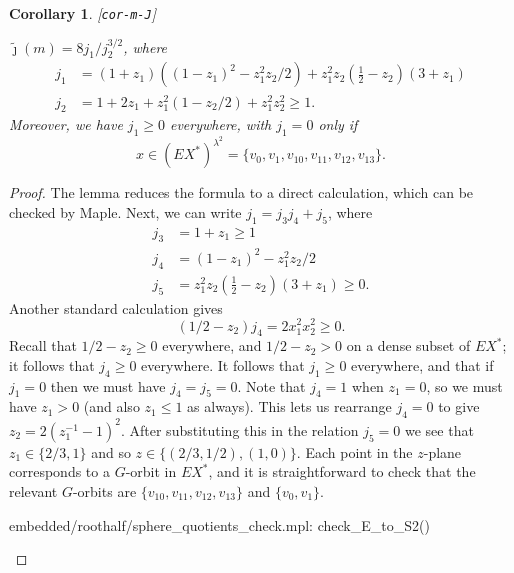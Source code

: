 \documentclass[reqno]{amsart}
\newcommand{\lbl}[1]{\label{#1}\textup{[\texttt{#1}]}\par}
\newcommand{\lbl}{\label}
\newcommand{\lm}        {\lambda}
\newcommand{\half}      {\tfrac{1}{2}}
\newcommand{\tj}	{\widetilde{\jmath}}
\renewcommand{\:}{\colon}
\newtheorem{corollary}[theorem]{Corollary}
\theoremstyle{definition}
\begin{document}
\begin{corollary}\lbl{cor-m-J}
 $\tj(m)=8j_1/j_2^{3/2}$, where
 \begin{align*}
  j_1 &= (1+z_1)((1-z_1)^2-z_1^2z_2/2) + z_1^2z_2(\half-z_2)(3+z_1) \\
  j_2 &= 1+2z_1+z_1^2(1-z_2/2)+z_1^2z_2^2 \geq 1.
 \end{align*}
 Moreover, we have $j_1\geq 0$ everywhere, with $j_1=0$ only if
 \[ x \in (EX^*)^{\lm^2} = \{v_0,v_1,v_{10},v_{11},v_{12},v_{13}\}. \]
\end{corollary}
\begin{proof}
 The lemma reduces the formula to a direct calculation, which can be
 checked by Maple.  Next, we can write $j_1=j_3j_4+j_5$, where
 \begin{align*}
  j_3 &= 1 + z_1 \geq 1 \\
  j_4 &= (1-z_1)^2-z_1^2z_2/2 \\
  j_5 &= z_1^2z_2(\half-z_2)(3+z_1) \geq 0.
 \end{align*}
 Another standard calculation gives
 \[ (1/2-z_2)j_4 = 2x_1^2x_2^2 \geq 0. \]
 Recall that $1/2-z_2\geq 0$ everywhere, and $1/2-z_2>0$ on a dense
 subset of $EX^*$; it follows that $j_4\geq 0$ everywhere.  It follows
 that $j_1\geq 0$ everywhere, and that if $j_1=0$ then we must have
 $j_4=j_5=0$.  Note that $j_4=1$ when $z_1=0$, so we must have
 $z_1>0$ (and also $z_1\leq 1$ as always).  This lets us rearrange
 $j_4=0$ to give $z_2=2(z_1^{-1}-1)^2$.  After substituting this in
 the relation $j_5=0$ we see that $z_1\in\{2/3,1\}$ and so
 $z\in\{(2/3,1/2),(1,0)\}$.  Each point in the $z$-plane corresponds
 to a $G$-orbit in $EX^*$, and it is straightforward to check that the
 relevant $G$-orbits are $\{v_{10},v_{11},v_{12},v_{13}\}$ and
 $\{v_0,v_1\}$.
 \begin{checks}
  embedded/roothalf/sphere_quotients_check.mpl: check_E_to_S2()
 \end{checks}
\end{proof}
\end{document}
